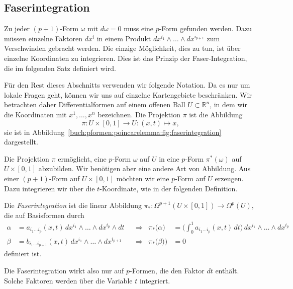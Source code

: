 %
%
\subsection{Faserintegration
\label{buch:pformen:poincare:subsection:faserintegration}}
%
Zu jeder $(p+1)$-Form $\omega$ mit $d\omega=0$ muss eine $p$-Form gefunden
werden.
Dazu müssen einzelne Faktoren $dx^i$ in einem Produkt
$dx^{i_1}\wedge\dots\wedge dx^{i_{p+1}}$ zum Verschwinden gebracht
werden.
Die einzige Möglichkeit, dies zu tun, ist über einzelne Koordinaten zu
integrieren.
Dies ist das Prinzip der Faser-Integration, die im folgenden Satz
definiert wird.

Für den Rest dieses Abschnitts verwenden wir folgende Notation.
Da es nur um lokale Fragen geht, können wir uns auf einzelne
Kartengebiete beschränken.
Wir betrachten daher Differentialformen auf einem offenen Ball
$U\subset\mathbb{R}^n$, in dem wir die Koordinaten mit $x^1,\dots,x^n$
bezeichnen.
Die Projektion $\pi$ ist die Abbildung
\[
\pi
\colon U \times [0,1]\to U : (x,t) \mapsto x,
\]
sie ist in Abbildung~\ref{buch:pformen:poincarelemma:fig:faserintegration}
dargestellt.

Die Projektion $\pi$ ermöglicht, eine $p$-Form $\omega$ auf $U$ in eine
$p$-Form $\pi^*(\omega)$ auf $U\times [0,1]$ abzubilden.
Wir benötigen aber eine andere Art von Abbildung.
Aus einer $(p+1)$-Form auf $U\times[0,1]$ möchten wir eine $p$-Form auf
$U$ erzeugen.
Dazu integrieren wir über die $t$-Koordinate, wie in der folgenden
Definition.

\begin{definition}
Die {\em Faserintegration} ist die linear Abbildung
%
$\pi_*\colon \Omega^{p+1}(U\times[0,1])\to\Omega^p(U)$,
die auf Basisformen durch
\begin{align*}
\alpha
&=
a_{i_1 \dots i_p}(x,t)
\,
dx^{i_1}\wedge\dots\wedge dx^{i_p}\wedge dt
&&\Rightarrow&
\pi_*\bigl(
\alpha
\bigr)
&=
\biggl(
\int_0^1 a_{i_1 \dots i_p}(x,t)\,dt
\biggr)
\,
dx^{i_1}\wedge\dots\wedge dx^{i_p}
\\
\beta
&=
b_{i_1 \dots i_{p+1}}(x,t)
\,
dx^{i_1}\wedge \dots \wedge dx^{i_{p+1}}
&&\Rightarrow&
\pi_*\bigl(\beta)
\bigr)
&=
0
\end{align*}
definiert ist.
\end{definition}

Die Faserintegration wirkt also nur auf $p$-Formen, die den Faktor $dt$
enthält.
Solche Faktoren werden über die Variable $t$ integriert.

